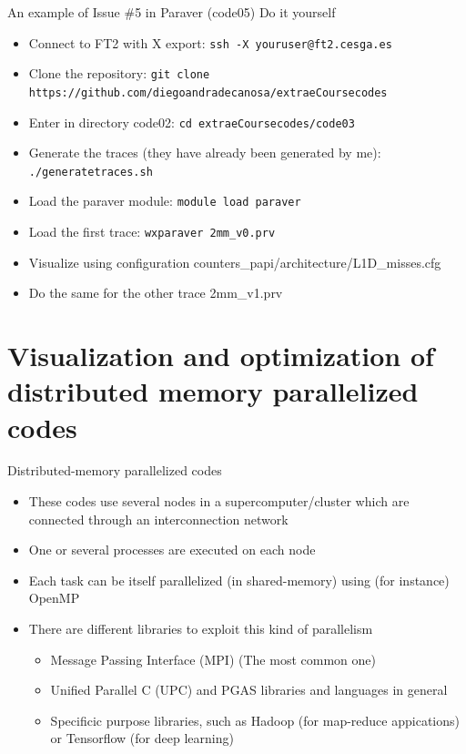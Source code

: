 \documentclass[10pt,xcolor=table]{beamer}
\begin{document}
\begin{frame}{An example of Issue \#5 in Paraver (code05)}
Do it yourself
\begin{itemize}
    \item Connect to FT2 with X export: {\tt ssh -X youruser@ft2.cesga.es}
    \item Clone the repository: {\tt git clone https://github.com/diegoandradecanosa/extraeCoursecodes}
    \item Enter in directory code02: {\tt cd extraeCoursecodes/code03}
    \item Generate the traces (they have already been generated by me): {\tt ./generatetraces.sh}
    \item Load the paraver module:  {\tt module load paraver}
    \item Load the first trace: {\tt wxparaver 2mm\_v0.prv}
    \item Visualize using configuration counters\_papi/architecture/L1D\_misses.cfg
    \item Do the same for the other trace 2mm\_v1.prv
\end{itemize}
\end{frame}




\section{Visualization and optimization of distributed memory parallelized codes}


\begin{frame}{Distributed-memory parallelized codes}
\begin{itemize}
    \item These codes use several nodes in a supercomputer/cluster which are connected through an interconnection network
    \item One or several processes are executed on each node
    \item Each task can be itself parallelized (in shared-memory) using (for instance) OpenMP
    \item There are different libraries to exploit this kind of parallelism
        \begin{itemize}
            \item Message Passing Interface (MPI) (The most common one) 
            \item Unified Parallel C (UPC) and PGAS libraries and languages in general
            \item Specificic purpose libraries, such as Hadoop (for map-reduce appications) or Tensorflow (for deep learning) 
        \end{itemize}
\end{itemize}
\end{frame}
\end{document}
